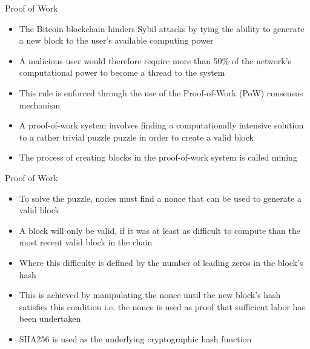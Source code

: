 \documentclass[11pt]{beamer}
\begin{document}

\begin{frame}{Proof of Work}
	\begin{itemize}
		\item The Bitcoin blockchain hinders Sybil attacks by tying the ability to generate a new block to the user's available computing power
		\item A malicious user would therefore require more than 50\% of the network's computational power to become a thread to the system
		\item This rule is enforced through the use of the Proof-of-Work (PoW) consensus mechanism
		\item A proof-of-work system involves finding a computationally intensive solution to a rather trivial puzzle puzzle in order to create a valid block
		\item The process of creating blocks in the proof-of-work system is called mining
	\end{itemize}
\end{frame}

\begin{frame}{Proof of Work}
	\begin{itemize}
		\item To solve the puzzle, nodes must find a nonce that can be used to generate a valid block
		\item A block will only be valid, if it was at least as difficult to compute than the most recent valid block in the chain
		\item Where this difficulty is defined by the number of leading zeros in the block's hash
		\item This is achieved by manipulating the nonce until the new block's hash satisfies this condition i.e. the nonce is used as proof that sufficient labor has been undertaken
		\item SHA256 is used as the underlying cryptographic hash function
		\end{itemize}
\end{frame}

\end{document}
